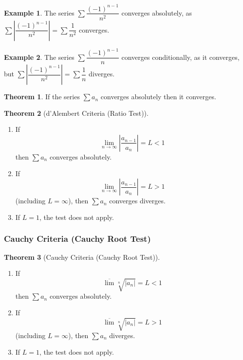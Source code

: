 \documentclass[fleqn, a4paper, 12pt, twoside]{article}
\theoremstyle{definition}
\newtheorem{example}{Example}
\theoremstyle{theorem}
\newtheorem{theorem}{Theorem}
\begin{document}
{\begin{example}
	The series $\sum \dfrac{(-1)^{n - 1}}{n^2}$ converges absolutely, as $\sum \left| \dfrac{(-1)^{n - 1}}{n^2} \right| = \sum \dfrac{1}{n^2}$ converges.
\end{example}

\begin{example}
	The series $\sum \dfrac{(-1)^{n - 1}}{n}$ converges conditionally, as it converges, but $\sum \left| \dfrac{(-1)^{n - 1}}{n^2} \right| = \sum \dfrac{1}{n}$ diverges.
\end{example}

\begin{theorem}
	If the series $\sum a_n$ converges absolutely then it converges.
\end{theorem}

\begin{theorem}[d'Alembert Criteria (Ratio Test)]
	\begin{enumerate}
		\item 
			If 
			\begin{equation*}
				\lim\limits_{n \to \infty} \left| \dfrac{a_{n - 1}}{a_n} \right| = L < 1
			\end{equation*}
			then $\sum a_n$ converges absolutely.
		\item 
			If 
			\begin{equation*}
				\lim\limits_{n \to \infty} \left| \dfrac{a_{n - 1}}{a_n} \right| = L > 1
			\end{equation*}
			(including $L = \infty$), then $\sum a_n$ converges diverges.
		\item If $L = 1$, the test does not apply.
	\end{enumerate}
	\label{d'Alembert Criteria (Ratio Test)}
\end{theorem}

\subsubsection{Cauchy Criteria (Cauchy Root Test)}

\begin{theorem}[Cauchy Criteria (Cauchy Root Test)]
	\begin{enumerate}
		\item
			If 
			\begin{equation*}
				\overline{\lim} \sqrt[n]{|a_n|} = L < 1
			\end{equation*}
			then $\sum a_n$ converges absolutely.
		\item
			If 
			\begin{equation*}
				\overline{\lim} \sqrt[n]{|a_n|} = L > 1
			\end{equation*}
			(including $L = \infty$), then $\sum a_n$ diverges.
		\item If $L = 1$, the test does not apply.
	\end{enumerate}
	\label{Cauchy Criteria (Cauchy Root Test)}
\end{theorem}

}
\end{document}
